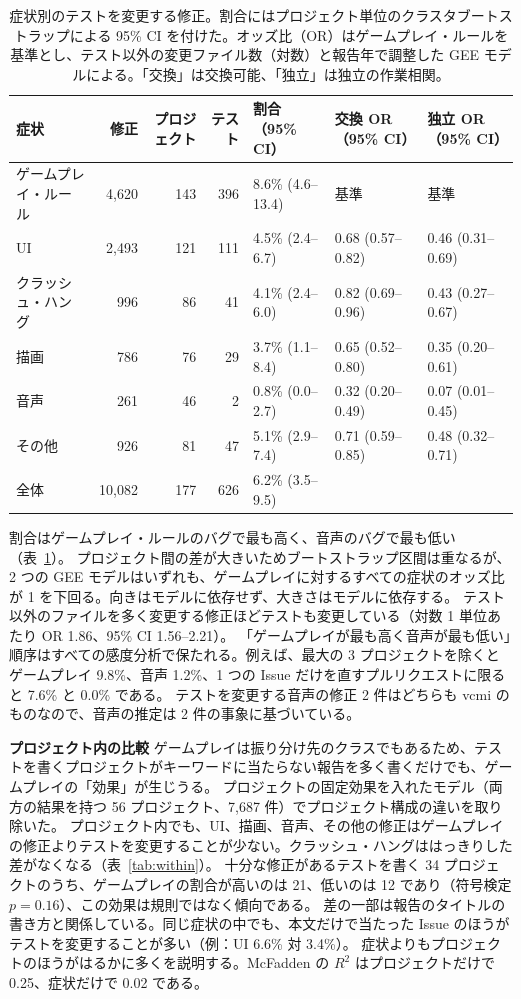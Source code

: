 \documentclass[a4paper,twocolumn,9pt]{ltjsarticle}
\newcommand{\para}[1]{\par\smallskip\noindent\textbf{#1}\quad}
\begin{document}
\begin{table}[tb]
\centering
\caption{症状別のテストを変更する修正。割合にはプロジェクト単位のクラスタブートストラップによる 95\% CI を付けた。オッズ比（OR）はゲームプレイ・ルールを基準とし、テスト以外の変更ファイル数（対数）と報告年で調整した GEE モデルによる。「交換」は交換可能、「独立」は独立の作業相関。}\label{tab:sym}
\small\setlength{\tabcolsep}{4pt}
\begin{tabular}{@{}lrrrlll@{}}
\toprule
症状 & 修正 & プロジェクト & テスト & 割合（95\% CI） & 交換 OR（95\% CI） & 独立 OR（95\% CI）\\
\midrule
ゲームプレイ・ルール & 4,620 & 143 & 396 & 8.6\% (4.6--13.4) & 基準 & 基準\\
UI & 2,493 & 121 & 111 & 4.5\% (2.4--6.7) & 0.68 (0.57--0.82) & 0.46 (0.31--0.69)\\
クラッシュ・ハング & 996 & 86 & 41 & 4.1\% (2.4--6.0) & 0.82 (0.69--0.96) & 0.43 (0.27--0.67)\\
描画 & 786 & 76 & 29 & 3.7\% (1.1--8.4) & 0.65 (0.52--0.80) & 0.35 (0.20--0.61)\\
音声 & 261 & 46 & 2 & 0.8\% (0.0--2.7) & 0.32 (0.20--0.49) & 0.07 (0.01--0.45)\\
その他 & 926 & 81 & 47 & 5.1\% (2.9--7.4) & 0.71 (0.59--0.85) & 0.48 (0.32--0.71)\\
\midrule
全体 & 10,082 & 177 & 626 & 6.2\% (3.5--9.5) & & \\
\bottomrule
\end{tabular}
\end{table}

割合はゲームプレイ・ルールのバグで最も高く、音声のバグで最も低い（表~\ref{tab:sym}）。
プロジェクト間の差が大きいためブートストラップ区間は重なるが、2 つの GEE モデルはいずれも、ゲームプレイに対するすべての症状のオッズ比が 1 を下回る。向きはモデルに依存せず、大きさはモデルに依存する。
テスト以外のファイルを多く変更する修正ほどテストも変更している（対数 1 単位あたり OR 1.86、95\% CI 1.56--2.21）。
「ゲームプレイが最も高く音声が最も低い」順序はすべての感度分析で保たれる。例えば、最大の 3 プロジェクトを除くとゲームプレイ 9.8\%、音声 1.2\%、1 つの Issue だけを直すプルリクエストに限ると 7.6\% と 0.0\% である。
テストを変更する音声の修正 2 件はどちらも vcmi のものなので、音声の推定は 2 件の事象に基づいている。

\para{プロジェクト内の比較}
ゲームプレイは振り分け先のクラスでもあるため、テストを書くプロジェクトがキーワードに当たらない報告を多く書くだけでも、ゲームプレイの「効果」が生じうる。
プロジェクトの固定効果を入れたモデル（両方の結果を持つ 56 プロジェクト、7,687 件）でプロジェクト構成の違いを取り除いた。
プロジェクト内でも、UI、描画、音声、その他の修正はゲームプレイの修正よりテストを変更することが少ない。クラッシュ・ハングははっきりした差がなくなる（表~\ref{tab:within}）。
十分な修正があるテストを書く 34 プロジェクトのうち、ゲームプレイの割合が高いのは 21、低いのは 12 であり（符号検定 $p=0.16$）、この効果は規則ではなく傾向である。
差の一部は報告のタイトルの書き方と関係している。同じ症状の中でも、本文だけで当たった Issue のほうがテストを変更することが多い（例：UI 6.6\% 対 3.4\%）。
症状よりもプロジェクトのほうがはるかに多くを説明する。McFadden の $R^2$ はプロジェクトだけで 0.25、症状だけで 0.02 である。
\end{document}
